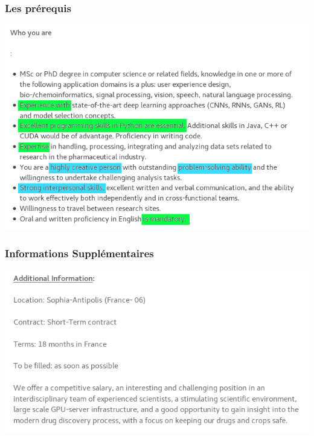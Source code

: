 \documentclass[french]{beamer}
\begin{document}
	\begin{frame}[fragile]
		\frametitle{Les prérequis}
		\includegraphics*[width = \linewidth]{images/you.png}\\
	\end{frame}

	\begin{frame}[fragile]
		\frametitle{Informations Supplémentaires}
		\includegraphics*[width = \linewidth]{images/additional.png}\\
	\end{frame}
\end{document}
